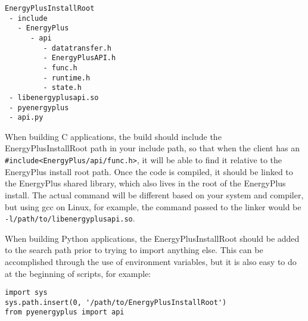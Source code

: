 \begin{lstlisting}
EnergyPlusInstallRoot
 - include
   - EnergyPlus
      - api
         - datatransfer.h
         - EnergyPlusAPI.h
         - func.h
         - runtime.h
         - state.h
 - libenergyplusapi.so
 - pyenergyplus
 - api.py
\end{lstlisting}

When building C applications, the build should include the EnergyPlusInstallRoot path in your include path, so that when the client has an \verb=#include<EnergyPlus/api/func.h>=, it will be able to find it relative to the EnergyPlus install root path.
Once the code is compiled, it should be linked to the EnergyPlus shared library, which also lives in the root of the EnergyPlus install.
The actual command will be different based on your system and compiler, but using gcc on Linux, for example, the command passed to the linker would be \verb=-l/path/to/libenergyplusapi.so=.

When building Python applications, the EnergyPlusInstallRoot should be added to the search path prior to trying to import anything else.
This can be accomplished through the use of environment variables, but it is also easy to do at the beginning of scripts, for example:

\begin{verbatim}
import sys
sys.path.insert(0, '/path/to/EnergyPlusInstallRoot')
from pyenergyplus import api
\end{verbatim}
